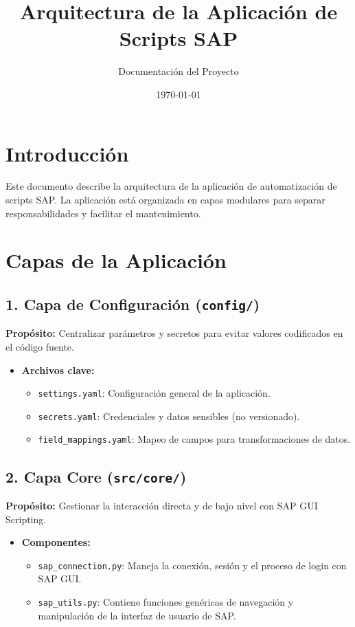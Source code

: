 \documentclass{article}
\title{Arquitectura de la Aplicación de Scripts SAP}
\author{Documentación del Proyecto}
\date{\today}
\begin{document}
\maketitle

\section{Introducción}
Este documento describe la arquitectura de la aplicación de automatización de scripts SAP. La aplicación está organizada en capas modulares para separar responsabilidades y facilitar el mantenimiento.

\section{Capas de la Aplicación}

\subsection{1. Capa de Configuración (\texttt{config/})}
\textbf{Propósito:} Centralizar parámetros y secretos para evitar valores codificados en el código fuente.

\begin{itemize}
    \item \textbf{Archivos clave:}
    \begin{itemize}
        \item \texttt{settings.yaml}: Configuración general de la aplicación.
        \item \texttt{secrets.yaml}: Credenciales y datos sensibles (no versionado).
        \item \texttt{field\_mappings.yaml}: Mapeo de campos para transformaciones de datos.
    \end{itemize}
\end{itemize}

\subsection{2. Capa Core (\texttt{src/core/})}
\textbf{Propósito:} Gestionar la interacción directa y de bajo nivel con SAP GUI Scripting.

\begin{itemize}
    \item \textbf{Componentes:}
    \begin{itemize}
        \item \texttt{sap\_connection.py}: Maneja la conexión, sesión y el proceso de login con SAP GUI.
        \item \texttt{sap\_utils.py}: Contiene funciones genéricas de navegación y manipulación de la interfaz de usuario de SAP.
    \end{itemize}
\end{itemize}
\end{document}
